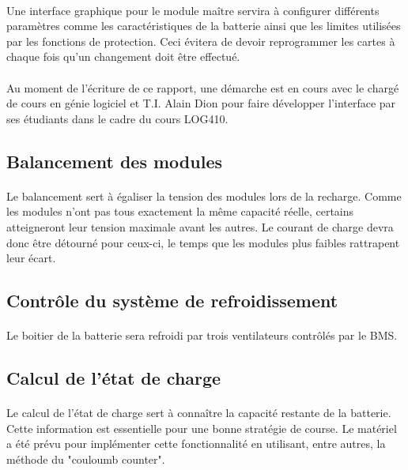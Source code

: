 		\paragraph{}
		Une interface graphique pour le module maître servira à configurer différents paramètres comme les caractéristiques de la batterie ainsi que les limites utilisées par les fonctions de protection. Ceci évitera de devoir reprogrammer les cartes à chaque fois qu'un changement doit être effectué.

		\paragraph{}
		Au moment de l'écriture de ce rapport, une démarche est en cours avec le chargé de cours en génie logiciel et T.I. Alain Dion pour faire développer l'interface par ses étudiants dans le cadre du cours LOG410.

	\subsection{Balancement des modules}

		\paragraph{}
		Le balancement sert à égaliser la tension des modules lors de la recharge. Comme les modules n'ont pas tous exactement la même capacité réelle, certains atteigneront leur tension maximale avant les autres. Le courant de charge devra donc être détourné pour ceux-ci, le temps que les modules plus faibles rattrapent leur écart.

	\subsection{Contrôle du système de refroidissement}

		\paragraph{}
		Le boitier de la batterie sera refroidi par trois ventilateurs contrôlés par le BMS.

	\subsection{Calcul de l’état de charge}

		\paragraph{}
		Le calcul de l'état de charge sert à connaître la capacité restante de la batterie. Cette information est essentielle pour une bonne stratégie de course. Le matériel a été prévu pour implémenter cette fonctionnalité en utilisant, entre autres, la méthode du "couloumb counter".


